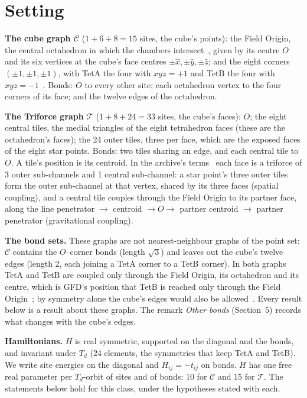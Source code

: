 \documentclass[twocolumn]{iopjournal}
\theoremstyle{definition}
\theoremstyle{remark}
\begin{document}
\section*{Setting}

\textbf{The cube graph $\mathcal C$} ($1 + 6 + 8 = 15$ sites, the cube's
points): the Field Origin, the
central octahedron in which the chambers intersect~\cite{NelsonColes},
given by its centre $O$ and its six vertices at the cube's face centres
$\pm\hat x,\pm\hat y,\pm\hat z$; and the eight corners $(\pm1,\pm1,\pm1)$,
with TetA the four with $xyz = +1$ and TetB the four with
$xyz = -1$~\cite{NelsonGram,Coxeter1973}. Bonds: $O$ to every other
site; each octahedron vertex to the four corners of its face; and the
twelve edges of the octahedron.

\textbf{The Triforce graph $\mathcal T$} ($1 + 8 + 24 = 33$ sites, the
cube's faces): $O$; the eight central
tiles, the medial triangles of the eight tetrahedron faces (these are
the octahedron's faces); the 24 outer tiles, three per face, which
are the exposed faces of the eight star points. Bonds: two tiles
sharing an edge, and each central tile to $O$. A tile's position is
its centroid. In the archive's terms~\cite{NelsonTriforce} each face is
a triforce of 3 outer sub-channels and 1 central sub-channel: a star
point's three outer tiles form the outer sub-channel at that vertex,
shared by its three faces (spatial coupling), and a central tile couples
through the Field Origin to its partner face, along the line penetrator
$\to$ centroid $\to O \to$ partner centroid $\to$ partner penetrator
(gravitational coupling).

\textbf{The bond sets.} These graphs are not nearest-neighbour graphs of
the point set: $\mathcal C$ contains the $O$--corner bonds (length
$\sqrt3$) and leaves out the cube's twelve edges (length 2, each joining
a TetA corner to a TetB corner). In both graphs TetA and TetB are
coupled only through the Field Origin, its octahedron and its centre,
which is GFD's position that TetB is reached only through the Field
Origin~\cite{NelsonColes}; by symmetry alone the cube's edges would also
be allowed~\cite{NelsonCoupling}. Every result below is a result about
these graphs. The remark \emph{Other bonds} (Section~5) records what changes with the cube's edges.

\textbf{Hamiltonians.} $H$ is real symmetric, supported on the diagonal
and the bonds, and invariant under $T_d$ (24 elements, the symmetries
that keep TetA and TetB). We write site energies on the diagonal and
$H_{ij} = -t_{ij}$ on bonds. $H$ has one free real parameter per
$T_d$-orbit of sites and of bonds: 10 for $\mathcal C$ and 15 for
$\mathcal T$. The statements below hold for this class, under the
hypotheses stated with each.
\end{document}
